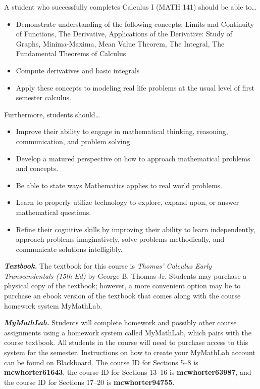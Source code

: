 \documentclass[11pt,letterpaper]{article}
\begin{document}

A student who successfully completes Calculus I (MATH 141) should be able to\dots
	\begin{itemize} \itemsep=0.3ex
	\item Demonstrate understanding of the following concepts: Limits and Continuity of Functions, The Derivative, Applications of the Derivative: Study of Graphs, Minima-Maxima, Mean Value Theorem, The Integral, The Fundamental Theorems of Calculus
	\item Compute derivatives and basic integrals
	\item Apply these concepts to modeling real life problems at the usual level of first semester calculus.
	\end{itemize}
Furthermore, students should\dots
	\begin{itemize} \itemsep=0.3ex
	\item  Improve their ability to engage in mathematical thinking, reasoning, communication, and problem solving.
	\item Develop a matured perspective on how to approach mathematical problems and concepts.
	\item Be able to state ways Mathematics applies to real world problems.
	\item Learn to properly utilize technology to explore, expand upon, or answer mathematical questions.
	\item Refine their cognitive skills by improving their ability to learn independently, approach problems imaginatively, solve problems methodically, and communicate solutions intelligibly.
	\end{itemize}
\sectionbreak




{\itshape\bfseries\color{scred}Textbook.} The textbook for this course is {\itshape Thomas' Calculus Early Transcendentals (15th Ed)} by George B. Thomas Jr. Students may purchase a physical copy of the textbook; however, a more convenient option may be to purchase an ebook version of the textbook that comes along with the course homework system MyMathLab. \pspace

{\itshape\bfseries\color{scred}MyMathLab.} Students will complete homework and possibly other course assignments using a homework system called MyMathLab, which pairs with the course textbook. All students in the course will need to purchase access to this system for the semester. Instructions on how to create your MyMathLab account can be found on Blackboard. The course ID for Sections 5--8 is \textbf{mcwhorter61643}, the course ID for Sections 13--16 is \textbf{mcwhorter63987}, and the course ID for Sections 17--20 is \textbf{mcwhorter94755}. \pspace
\end{document}
